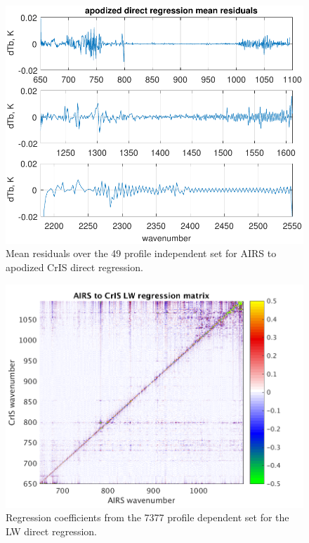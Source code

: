 \documentclass[journal]{IEEEtran}
\begin{document}
\begin{figure} %
  \centering
  \includegraphics[width=\linewidth]{figures/ap_dir_regr.pdf}
  \caption{Mean residuals over the 49 profile independent set for
    AIRS to apodized CrIS direct regression.}
  \label{dreg1}
\end{figure}

\begin{figure} %
  \centering
  \includegraphics[width=\linewidth]{figures/LW_dir_regr_mat.png}
  \caption{Regression coefficients from the 7377 profile dependent set for
  the LW direct regression.}
  \label{dreg3}
\end{figure}
\end{document}
